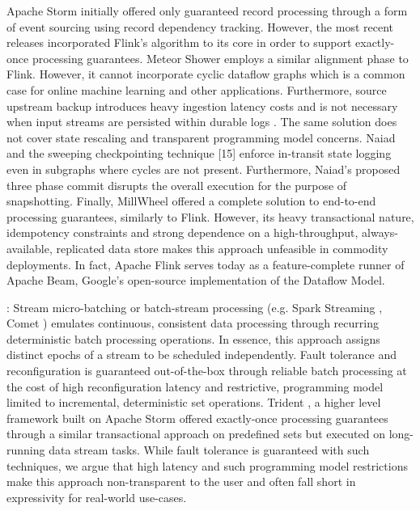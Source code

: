 Apache Storm \cite{CUSTOM:web/Storm} initially offered only guaranteed record processing through a form of event sourcing using record dependency tracking. However, the most recent releases incorporated Flink's algorithm to its core \cite{CUSTOM:web/stormsux} in order to support exactly-once processing guarantees. Meteor Shower \cite{wang2012meteor} employs a similar alignment phase to Flink. However, it cannot incorporate cyclic dataflow graphs which is a common case for online machine learning \cite{de2015samoa} and other applications. Furthermore, source upstream backup introduces heavy ingestion latency costs and is not necessary when input streams are persisted within durable logs \cite{kreps2011kafka}. The same solution does not cover state rescaling and transparent programming model concerns. Naiad \cite{murray2013naiad} and the sweeping checkpointing technique [15] enforce in-transit state logging even in subgraphs where cycles are not present. Furthermore, Naiad's proposed three phase commit disrupts the overall execution for the purpose of snapshotting. Finally, MillWheel \cite{millwheel} offered a complete solution to end-to-end processing guarantees, similarly to Flink. However, its heavy transactional nature, idempotency constraints and strong dependence on a high-throughput, always-available, replicated data store \cite{chang2008bigtable,corbett2013spanner} makes this approach unfeasible in commodity deployments. In fact, Apache Flink serves today as a feature-complete runner of Apache Beam, Google's open-source implementation of the Dataflow Model\cite{CUSTOM:web/Dataflow}.

: Stream micro-batching or batch-stream processing (e.g. Spark Streaming \cite{zaharia2012discretized}, Comet \cite{he2010comet}) emulates continuous, consistent data processing through recurring deterministic batch processing operations. In essence, this approach assigns distinct epochs of a stream to be scheduled independently. Fault tolerance and reconfiguration is guaranteed out-of-the-box through reliable batch processing at the cost of high reconfiguration latency and restrictive, programming model limited to incremental, deterministic set operations. Trident \cite{CUSTOM:web/trident}, a higher level framework built on Apache Storm offered exactly-once processing guarantees through a similar transactional approach on predefined sets but executed on long-running data stream tasks. While fault tolerance is guaranteed with such techniques, we argue that high latency and such programming model restrictions make this approach non-transparent to the user and often fall short in expressivity for real-world use-cases.

